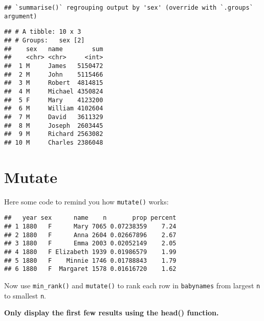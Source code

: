 \documentclass[
]{article}
\newenvironment{Shaded}{\begin{snugshade}}{\end{snugshade}}
\newcommand{\DataTypeTok}[1]{\textcolor[rgb]{0.13,0.29,0.53}{#1}}
\newcommand{\DecValTok}[1]{\textcolor[rgb]{0.00,0.00,0.81}{#1}}
\newcommand{\KeywordTok}[1]{\textcolor[rgb]{0.13,0.29,0.53}{\textbf{#1}}}
\newcommand{\NormalTok}[1]{#1}
\newcommand{\OperatorTok}[1]{\textcolor[rgb]{0.81,0.36,0.00}{\textbf{#1}}}
\newcommand{\StringTok}[1]{\textcolor[rgb]{0.31,0.60,0.02}{#1}}
\begin{document}
\begin{verbatim}
## `summarise()` regrouping output by 'sex' (override with `.groups` argument)
\end{verbatim}

\begin{verbatim}
## # A tibble: 10 x 3
## # Groups:   sex [2]
##    sex   name        sum
##    <chr> <chr>     <int>
##  1 M     James   5150472
##  2 M     John    5115466
##  3 M     Robert  4814815
##  4 M     Michael 4350824
##  5 F     Mary    4123200
##  6 M     William 4102604
##  7 M     David   3611329
##  8 M     Joseph  2603445
##  9 M     Richard 2563082
## 10 M     Charles 2386048
\end{verbatim}

\hypertarget{mutate}{%
\section{Mutate}\label{mutate}}

Here some code to remind you how \texttt{mutate()} works:

\begin{Shaded}
\end{Shaded}

\begin{verbatim}
##   year sex      name    n       prop percent
## 1 1880   F      Mary 7065 0.07238359    7.24
## 2 1880   F      Anna 2604 0.02667896    2.67
## 3 1880   F      Emma 2003 0.02052149    2.05
## 4 1880   F Elizabeth 1939 0.01986579    1.99
## 5 1880   F    Minnie 1746 0.01788843    1.79
## 6 1880   F  Margaret 1578 0.01616720    1.62
\end{verbatim}

Now use \texttt{min\_rank()} and \texttt{mutate()} to rank each row in
\texttt{babynames} from largest \texttt{n} to smallest \texttt{n}.

\textbf{Only display the first few results using the head() function.}

\begin{Shaded}
\end{Shaded}
\end{document}
